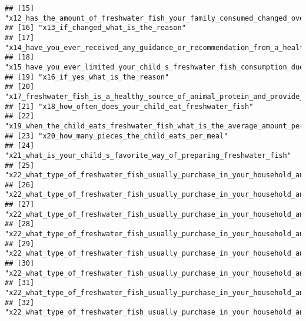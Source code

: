 \documentclass[
]{article}
\begin{document}
\begin{verbatim}
## [15] "x12_has_the_amount_of_freshwater_fish_your_family_consumed_changed_over_the_last_3_years"                                                    
## [16] "x13_if_changed_what_is_the_reason"                                                                                                           
## [17] "x14_have_you_ever_received_any_guidance_or_recommendation_from_a_healthcare_professional_regarding_freshwater_fish_consumption_of_your_child"
## [18] "x15_have_you_ever_limited_your_child_s_freshwater_fish_consumption_due_to_any_reason"                                                        
## [19] "x16_if_yes_what_is_the_reason"                                                                                                               
## [20] "x17_freshwater_fish_is_a_healthy_source_of_animal_protein_and_provide_other_important_nutrients_for_children"                                
## [21] "x18_how_often_does_your_child_eat_freshwater_fish"                                                                                           
## [22] "x19_when_the_child_eats_freshwater_fish_what_is_the_average_amount_per_day"                                                                  
## [23] "x20_how_many_pieces_the_child_eats_per_meal"                                                                                                 
## [24] "x21_what_is_your_child_s_favorite_way_of_preparing_freshwater_fish"                                                                          
## [25] "x22_what_type_of_freshwater_fish_usually_purchase_in_your_household_and_how_much_per_month_tilapia"                                          
## [26] "x22_what_type_of_freshwater_fish_usually_purchase_in_your_household_and_how_much_per_month_korali"                                           
## [27] "x22_what_type_of_freshwater_fish_usually_purchase_in_your_household_and_how_much_per_month_hunga"                                            
## [28] "x22_what_type_of_freshwater_fish_usually_purchase_in_your_household_and_how_much_per_month_loolla"                                           
## [29] "x22_what_type_of_freshwater_fish_usually_purchase_in_your_household_and_how_much_per_month_pethiya"                                          
## [30] "x22_what_type_of_freshwater_fish_usually_purchase_in_your_household_and_how_much_per_month_aandha"                                           
## [31] "x22_what_type_of_freshwater_fish_usually_purchase_in_your_household_and_how_much_per_month_kawayya"                                          
## [32] "x22_what_type_of_freshwater_fish_usually_purchase_in_your_household_and_how_much_per_month_ankutta"                                          

\end{verbatim}
\end{document}
